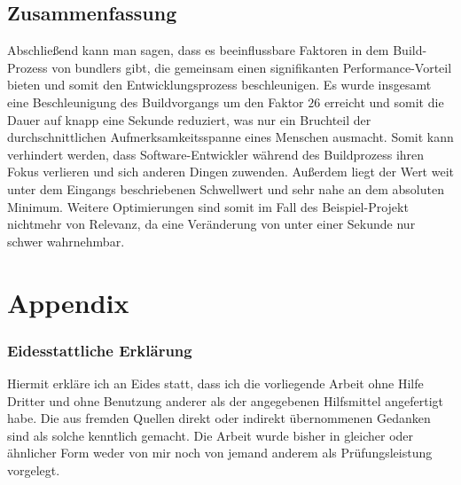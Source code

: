 \documentclass[11pt]{report}
\newcommand*{\SignatureAndDate}[1]{%
    \par\noindent\makebox[2.5in]{\hrulefill}
           \hfill\makebox[2.0in]{\hrulefill}
    \par\noindent\makebox[2.5in][l]{#1}
           \hfill\makebox[2.0in][l]{Datum}
}
\begin{document}
		\section{Zusammenfassung}
			Abschließend kann man sagen, dass es beeinflussbare Faktoren in dem Build-Prozess von \Glspl{bundler} gibt, die gemeinsam einen signifikanten Performance-Vorteil bieten und somit den Entwicklungsprozess beschleunigen. Es wurde insgesamt eine Beschleunigung des Buildvorgangs um den Faktor $26$ erreicht und somit die Dauer auf knapp eine Sekunde reduziert, was nur ein Bruchteil der durchschnittlichen Aufmerksamkeitsspanne eines Menschen ausmacht. Somit kann verhindert werden, dass Software-Entwickler während des Buildprozess ihren Fokus verlieren und sich anderen Dingen zuwenden. Außerdem liegt der Wert weit unter dem Eingangs beschriebenen Schwellwert und sehr nahe an dem absoluten Minimum. Weitere Optimierungen sind somit im Fall des Beispiel-Projekt nichtmehr von Relevanz, da eine Veränderung von unter einer Sekunde nur schwer wahrnehmbar.
			
			
    \pagebreak

    \chapter{Appendix}
	    \hspace{0pt}
    \vfill
    \subsection*{Eidesstattliche Erklärung}
        Hiermit erkläre ich an Eides statt, dass ich die vorliegende Arbeit ohne Hilfe Dritter und ohne Benutzung anderer als der angegebenen Hilfsmittel angefertigt habe. Die aus fremden Quellen direkt oder indirekt übernommenen Gedanken sind als solche kenntlich gemacht. Die Arbeit wurde bisher in gleicher oder ähnlicher Form weder von mir noch von jemand anderem als Prüfungsleistung vorgelegt.
        \vspace{2cm}
        \SignatureAndDate{Unterschrift}
    \vfill
    \hspace{0pt}
    
\end{document}
